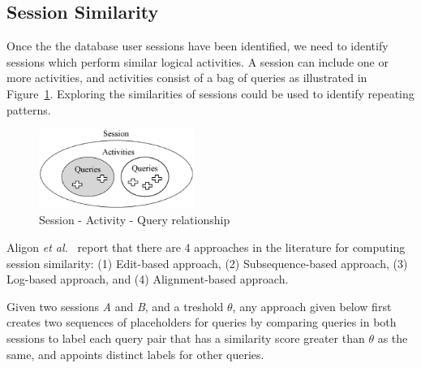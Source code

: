
\subsection{Session Similarity}

Once the the database user sessions have been identified, we need to identify sessions which perform similar logical activities.
A session can include one or more activities, and activities consist of a bag of queries as illustrated in Figure~\ref{fig:session}.
Exploring the similarities of sessions could be used to identify repeating patterns.

\begin{figure}[h!]
    \centering
    \includegraphics[width=0.45\textwidth]{graphics/Session}
    \caption{Session - Activity - Query relationship}
    \label{fig:session}
\end{figure}

Aligon \textit{et al.}~\cite{aligon2014similarity} report that there are 4 approaches in the literature for computing session similarity: (1) Edit-based approach, (2) Subsequence-based approach, (3) Log-based approach, and (4) Alignment-based approach.

Given two sessions \textit{A} and \textit{B}, and a treshold $\theta$, any approach given below first creates two sequences of placeholders for queries by comparing queries in both sessions to label each query pair that has a similarity score greater than $\theta$ as the same, and appoints distinct labels for other queries.

